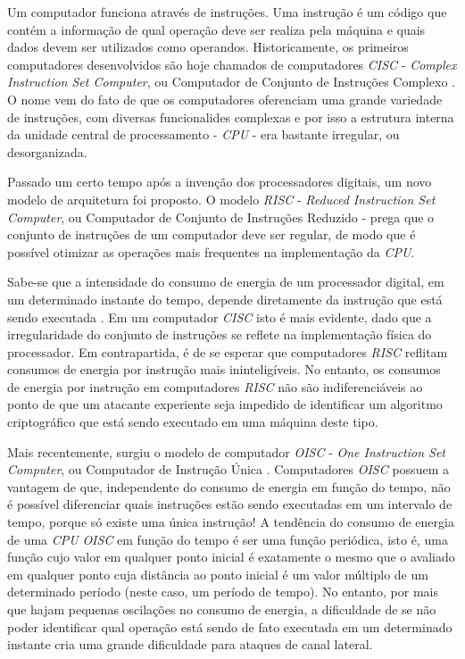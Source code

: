 Um computador funciona através de instruções. Uma instrução é um código que contém a informação de qual operação deve ser realiza pela máquina e quais dados devem ser utilizados como operandos. Historicamente, os primeiros computadores desenvolvidos são hoje chamados de computadores \textit{CISC} - \textit{Complex Instruction Set Computer}, ou Computador de Conjunto de Instruções Complexo \cite{chang1999customization}. O nome vem do fato de que os computadores oferenciam uma grande variedade de instruções, com diversas funcionalides complexas e por isso a estrutura interna da unidade central de processamento - \textit{CPU} - era bastante irregular, ou desorganizada.

Passado um certo tempo após a invenção dos processadores digitais, um novo modelo de arquitetura foi proposto. O modelo \textit{RISC} - \textit{Reduced Instruction Set Computer}, ou Computador de Conjunto de Instruções Reduzido \cite{patterson} - prega que o conjunto de instruções de um computador deve ser regular, de modo que é possível otimizar as operações mais frequentes na implementação da \textit{CPU}.

Sabe-se que a intensidade do consumo de energia de um processador digital, em um determinado instante do tempo, depende diretamente da instrução que está sendo executada \cite{hsieh2001microprocessor}. Em um computador \textit{CISC} isto é mais evidente, dado que a irregularidade do conjunto de instruções se reflete na implementação física do processador. Em contrapartida, é de se esperar que computadores \textit{RISC} reflitam consumos de energia por instrução mais ininteligíveis. No entanto, os consumos de energia por instrução em computadores \textit{RISC} não são indiferenciáveis ao ponto de que um atacante experiente seja impedido de identificar um algoritmo criptográfico que está sendo executado em uma máquina deste tipo.

Mais recentemente, surgiu o modelo de computador \textit{OISC} - \textit{One Instruction Set Computer}, ou Computador de Instrução Única \cite{ong2010implementation}. Computadores \textit{OISC} possuem a vantagem de que, independente do consumo de energia em função do tempo, não é possível diferenciar quais instruções estão sendo executadas em um intervalo de tempo, porque só existe uma única instrução! A tendência do consumo de energia de uma \textit{CPU} \textit{OISC} em função do tempo é ser uma função periódica, isto é, uma função cujo valor em qualquer ponto inicial é exatamente o mesmo que o avaliado em qualquer ponto cuja distância ao ponto inicial é um valor múltiplo de um determinado período (neste caso, um período de tempo). No entanto, por mais que hajam pequenas oscilações no consumo de energia, a dificuldade de se não poder identificar qual operação está sendo de fato executada em um determinado instante cria uma grande dificuldade para ataques de canal lateral.

